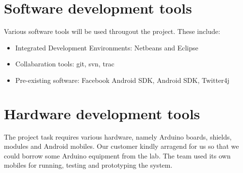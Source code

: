 
\section{Software development tools}

Various software tools will be used througout the project. These include: 
\begin{itemize}
\item Integrated Development Environments: Netbeans and Eclipse 
\item Collabaration tools: git, svn, trac 
\item Pre-existing software: Facebook Android SDK, Android SDK, Twitter4j 
\end{itemize}

\section{Hardware development tools}

The project task requires various hardware, namely Arduino boards,
shields, modules and Android mobiles. Our customer kindly arragend
for us so that we could borrow some Arduino equipment from the lab.
The team used its own mobiles for running, testing and prototyping
the system. 
